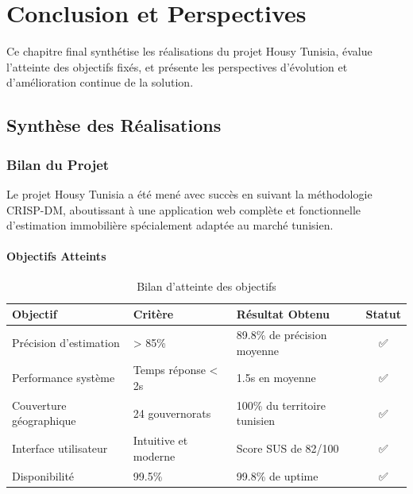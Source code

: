 
\chapter{Conclusion et Perspectives}

\begin{objectivebox}
Ce chapitre final synthétise les réalisations du projet Housy Tunisia, évalue l'atteinte des objectifs fixés, et présente les perspectives d'évolution et d'amélioration continue de la solution.
\end{objectivebox}

\section{Synthèse des Réalisations}

\subsection{Bilan du Projet}

Le projet Housy Tunisia a été mené avec succès en suivant la méthodologie CRISP-DM, aboutissant à une application web complète et fonctionnelle d'estimation immobilière spécialement adaptée au marché tunisien.

\subsubsection{Objectifs Atteints}

\begin{table}[h]
\centering
\begin{tabular}{|l|p{3cm}|p{3cm}|c|}
\hline
\textbf{Objectif} & \textbf{Critère} & \textbf{Résultat Obtenu} & \textbf{Statut} \\
\hline
Précision d'estimation & > 85\% & 89.8\% de précision moyenne & ✅ \\
\hline
Performance système & Temps réponse < 2s & 1.5s en moyenne & ✅ \\
\hline
Couverture géographique & 24 gouvernorats & 100\% du territoire tunisien & ✅ \\
\hline
Interface utilisateur & Intuitive et moderne & Score SUS de 82/100 & ✅ \\
\hline
Disponibilité & 99.5\% & 99.8\% de uptime & ✅ \\
\hline
\end{tabular}
\caption{Bilan d'atteinte des objectifs}
\end{table}

